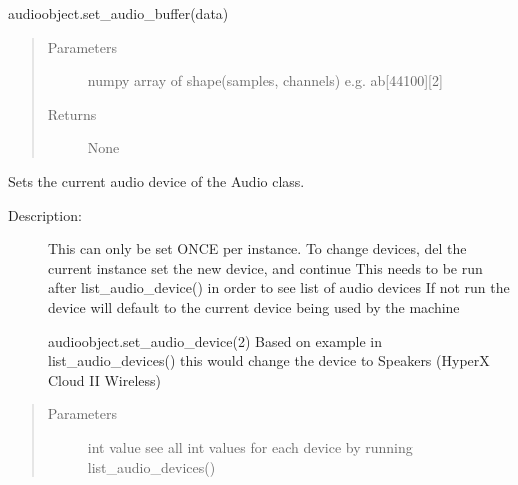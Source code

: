 \documentclass[letterpaper,10pt,english,openany,oneside]{sphinxmanual}
\begin{document}
\begin{fulllineitems}
\begin{fulllineitems}
\begin{description}
\begin{description}
\sphinxAtStartPar
audioobject.set\_audio\_buffer(data)

\end{description}

\end{description}
\begin{quote}\begin{description}
\item[{Parameters}] \leavevmode
\sphinxAtStartPar
{} \textendash{} numpy array of shape(samples, channels) e.g. ab{[}44100{]}{[}2{]}

\item[{Returns}] \leavevmode
\sphinxAtStartPar
None

\end{description}\end{quote}

\end{fulllineitems}


\begin{fulllineitems}
\label{\detokenize{dpav:dpav.audio.Audio.set_audio_device}}
\sphinxAtStartPar
Sets the current audio device of the Audio class.
\begin{description}
\item[{Description:}] \leavevmode
\sphinxAtStartPar
This can only be set ONCE per instance. To change devices, del the current instance
set the new device, and continue
This needs to be run after list\_audio\_device() in order to see list of audio devices
If not run the device will default to the current device being used by the machine

\sphinxAtStartPar
audioobject.set\_audio\_device(2)
Based on example in list\_audio\_devices() this would change the device to Speakers (HyperX Cloud II Wireless)

\end{description}
\begin{quote}\begin{description}
\item[{Parameters}] \leavevmode
\sphinxAtStartPar
{} \textendash{} int value \sphinxhyphen{} see all int values for each device by running list\_audio\_devices()


\end{description}
\end{quote}
\end{fulllineitems}
\end{fulllineitems}
\end{document}
